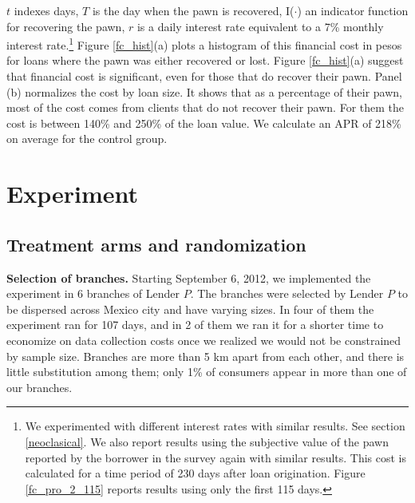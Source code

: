 \documentclass[oneside,11pt]{article}
\begin{document}
\noindent $t$ indexes days, $T$ is the day when the pawn is recovered, I($\cdot$) an indicator function for recovering the pawn, $r$ is a daily interest rate equivalent to a 7\% monthly interest rate.\footnote{We experimented with different interest rates with similar results. See section \ref{neoclasical}. We also report results using the subjective value of the pawn reported by the borrower in the survey again with similar results. This cost is calculated for a time period of 230 days after loan origination. Figure \ref{fc_pro_2_115} reports results using only the first 115 days.} Figure \ref{fc_hist}(a) plots a histogram of this financial cost in pesos for loans where the pawn was either recovered or lost. %
Figure \ref{fc_hist}(a) suggest that financial cost is significant, even for those that do recover their pawn. Panel (b) normalizes the cost by loan size. It shows that as a percentage of their pawn, most of the cost comes from clients that do not recover their pawn. For them the cost is between 140\% and 250\% of the loan value. %
We calculate an APR of 218\% on average for the control group.%


\section{Experiment} \label{Experiment}

\subsection{Treatment arms and randomization}

\noindent \textbf{Selection of branches.} Starting September 6, 2012, we implemented the experiment in 6 branches of Lender $P$. The branches were selected by Lender $P$ to be dispersed across Mexico city and have varying sizes. In four of them the experiment ran for 107 days, and in 2 of them we ran it for a shorter time to economize on data collection costs once we realized we would not be constrained by sample size. %
Branches are more than 5 km apart from each other, and there is little substitution among them; only 1\% of consumers appear in more than one of our branches.
\end{document}
